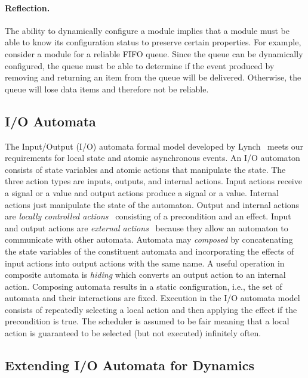 \documentclass[letterpaper]{article}
\begin{document}
\paragraph{Reflection.}
The ability to dynamically configure a module implies that a module must be able to know its configuration status to preserve certain properties.
For example, consider a module for a reliable FIFO queue.
Since the queue can be dynamically configured, the queue must be able to determine if the event produced by removing and returning an item from the queue will be delivered.
Otherwise, the queue will lose data items and therefore not be reliable.

\subsection{I/O Automata}

The Input/Output (I/O) automata formal model developed by Lynch~\cite{distributed_algorithms} meets our requirements for local state and atomic asynchronous events.
An I/O automaton consists of state variables and atomic actions that manipulate the state.
The three action types are inputs, outputs, and internal actions.
Input actions receive a signal or a value and output actions produce a signal or a value.
Internal actions just manipulate the state of the automaton.
Output and internal actions are \emph{locally controlled actions}~\cite{distributed_algorithms} consisting of a precondition and an effect.
Input and output actions are \emph{external actions}~\cite{distributed_algorithms} because they allow an automaton to communicate with other automata.
Automata may \emph{composed} by concatenating the state variables of the constituent automata and incorporating the effects of input actions into output actions with the same name.
A useful operation in composite automata is \emph{hiding} which converts an output action to an internal action.
Composing automata results in a static configuration, i.e., the set of automata and their interactions are fixed.
Execution in the I/O automata model consists of repeatedly selecting a local action and then applying the effect if the precondition is true.
The scheduler is assumed to be fair meaning that a local action is guaranteed to be selected (but not executed) infinitely often.

\subsection{Extending I/O Automata for Dynamics}
\end{document}
